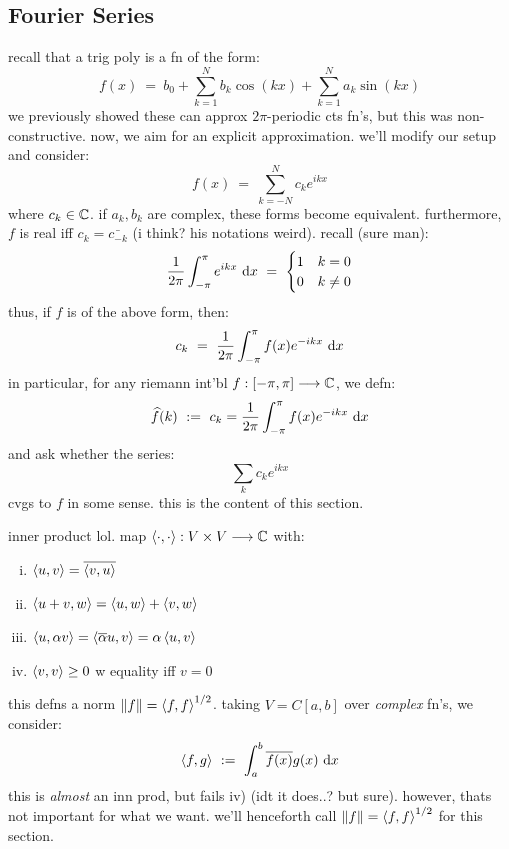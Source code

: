 \subsection{Fourier Series}

recall that a trig poly is a fn of the form:
\begin{equation*}
	f(x) \ = \ b_{0}+\sum_{k=1}^{N}b_{k}\cos(kx)+\sum_{k=1}^{N}a_{k}\sin(kx)
\end{equation*}
we previously showed these can approx $2\pi$-periodic cts fn's, but this was non-constructive.
now, we aim for an explicit approximation.
we'll modify our setup and consider:
\begin{equation*}
	f(x) \ = \ \sum_{k=-N}^{N}c_{k}e^{ikx}
\end{equation*}
where $c_{k}\in\mathbb{C}$.
if $a_{k},b_{k}$ are complex, these forms become equivalent.
furthermore, $f$ is real iff $c_{k}=\bar{c_{-k}}$
(i think? his notations weird).
recall (sure man):
\begin{equation*}
	\frac{1}{2\pi}\int_{-\pi}^{\pi}e^{ikx}\textrm{ d} x \ = \
	\begin{cases}
		1 & k=0 \\ 0 & k\neq0
	\end{cases}
\end{equation*}
thus, if $f$ is of the above form, then:
\begin{equation*}
	c_{k} \ = \ \frac{1}{2\pi}\int_{-\pi}^{\pi}f(x)e^{-ikx}\di x
\end{equation*}
in particular, for any riemann int'bl $f:[-\pi,\pi]\longrightarrow\mathbb{C}$, we defn:
\begin{equation*}
	\widehat{f}(k) \ := \ c_{k} = \frac{1}{2\pi}\int_{-\pi}^{\pi}f(x)e^{-ikx}\textrm{ d} x
\end{equation*}
and ask whether the series:
\begin{equation*}
	\sum_{k}c_{k}e^{ikx}
\end{equation*}
cvgs to $f$ in some sense.
this is the content of this section.

\begin{defn}
	inner product lol. map $\left\langle{\cdot,\cdot}\right\rangle:V\times V\longrightarrow\mathbb{C}$ with:
	\begin{enumerate}[i)]
		\item $\left\langle{u,v}\right\rangle=\overline{\left\langle{v,u}\right\rangle}$
		\item $\left\langle{u+v,w}\right\rangle=\left\langle{u,w}\right\rangle+\left\langle{v,w}\right\rangle$
		\item $\left\langle{u,\alpha v}\right\rangle=\left\langle{\overline{\alpha}u,v}\right\rangle=\alpha\left\langle{u,v}\right\rangle$
		\item $\left\langle{v,v}\right\rangle\geq0$ w equality iff $v=0$
	\end{enumerate}
\end{defn}
this defns a norm $\left\|f\right\|=\left\langle{f,f}\right\rangle^{1/2}$.
taking $V=C[a,b]$ over \textit{complex} fn's, we consider:
\begin{equation*}
	\left\langle{f,g}\right\rangle \ := \ \int_{a}^{b}\overline{f(x)}g(x)\textrm{ d} x
\end{equation*}
this is \textit{almost} an inn prod, but fails iv) (idt it does..? but sure).
however, thats not important for what we want.
we'll henceforth call $\left\|f\right\|=\left\langle{f,f}\right\rangle^{1/2}$ for this section.

